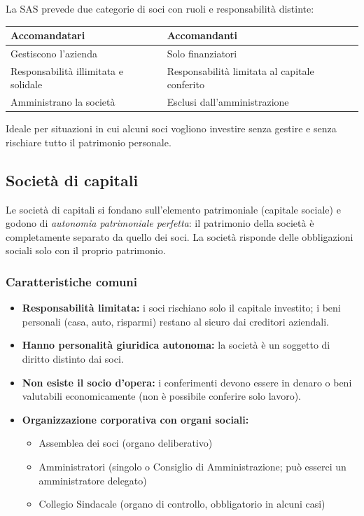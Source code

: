 \documentclass[a4paper,12pt]{article}
\begin{document}
	La SAS prevede due categorie di soci con ruoli e responsabilità distinte:
	
	\begin{table}[h]
		\centering
		\begin{tabular}{|l|l|}
			\hline
			\textbf{Accomandatari} & \textbf{Accomandanti} \\
			\hline
			Gestiscono l'azienda & Solo finanziatori \\
			Responsabilità illimitata e solidale & Responsabilità limitata al capitale conferito \\
			Amministrano la società & Esclusi dall'amministrazione \\
			\hline
		\end{tabular}
	\end{table}
	
	Ideale per situazioni in cui alcuni soci vogliono investire senza gestire e senza rischiare tutto il patrimonio personale.
	
	\subsection{Società di capitali}
	
	Le società di capitali si fondano sull'elemento patrimoniale (capitale sociale) e godono di \emph{autonomia patrimoniale perfetta}: il patrimonio della società è completamente separato da quello dei soci.%
	La società risponde delle obbligazioni sociali solo con il proprio patrimonio.
	
	\subsubsection{Caratteristiche comuni}
	
	\begin{itemize}
		\item \textbf{Responsabilità limitata:} i soci rischiano solo il capitale investito; i beni personali (casa, auto, risparmi) restano al sicuro dai creditori aziendali.
		\item \textbf{Hanno personalità giuridica autonoma:} la società è un soggetto di diritto distinto dai soci.
		\item \textbf{Non esiste il socio d'opera:} i conferimenti devono essere in denaro o beni valutabili economicamente (non è possibile conferire solo lavoro).
		\item \textbf{Organizzazione corporativa con organi sociali:}
		\begin{itemize}
			\item Assemblea dei soci (organo deliberativo)
			\item Amministratori (singolo o Consiglio di Amministrazione; può esserci un amministratore delegato)
			\item Collegio Sindacale (organo di controllo, obbligatorio in alcuni casi)
		\end{itemize}
	\end{itemize}
	
\end{document}
